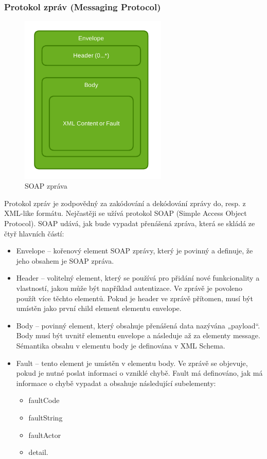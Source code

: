 \documentclass[11pt,twoside,a4paper]{book}
\begin{document}
\subsubsection{Protokol zpráv (Messaging Protocol)}

\begin{figure}[h]
\begin{center}
\includegraphics[width=7cm]{images-pdf/soap.pdf} 
\caption{SOAP zpráva}
\label{fig:logo}
\end{center}
\end{figure}

Protokol zpráv je zodpovědný za zakódování a dekódování zprávy do, resp. z XML-like
formátu. Nejčastěji se užívá protokol SOAP (Simple Access Object Protocol). SOAP udává,
jak bude vypadat přenášená zpráva, která se skládá ze čtyř hlavních částí:

\begin{itemize}
\item Envelope – kořenový element SOAP zprávy, který je povinný a definuje, že jeho
obsahem je SOAP zpráva.

\item Header –
volitelný element, který se používá pro přidání nové funkcionality a
vlastností, jakou může být například autentizace. Ve zprávě je povoleno použít více
těchto elementů. Pokud je header ve zprávě přítomen, musí být umístěn jako první
child element elementu envelope.
 
\item Body – povinný element, který obsahuje přenášená data nazývána „payload“. Body
musí být uvnitř elementu envelope a následuje až za elementy message. Sémantika
obsahu v elementu body je definována v XML Schema.

\item Fault – tento element je umístěn v elementu body. Ve zprávě se objevuje, pokud je
nutné poslat informaci o vzniklé chybě. Fault má definováno, jak má informace o
chybě vypadat a obsahuje následující subelementy:

\begin{itemize}
  \item faultCode
  \item faultString
  \item faultActor
  \item detail.
\end{itemize}
\end{itemize}
\end{document}
